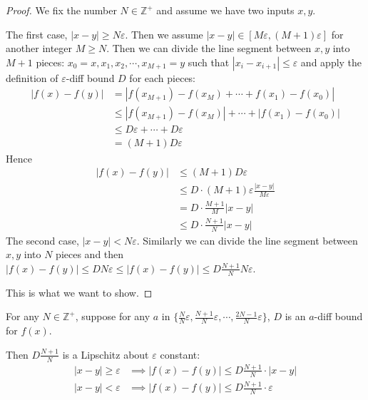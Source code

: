 \documentclass{llncs}
\begin{document}
\begin{proof} We fix the number $N\in\mathbb{Z}^+$ and assume we have two inputs $x, y$.
	
	The first case, $|x-y|\geq N\varepsilon$. Then we assume $|x-y| \in [M\varepsilon ,  (M+1)\varepsilon]$ for another integer $M\geq N$. Then we can divide the line segment between $x, y$ into $M+1$ pieces: $x_0 = x, x_1, x_2, \cdots, x_{M+1} = y$ such that $|x_i-x_{i+1}| \leq \varepsilon$ and apply the definition of $\varepsilon$-diff bound $D$ for each pieces:\begin{align*}
		|f(x)-f(y)| &= |f(x_{M+1})-f(x_M)+\cdots+f(x_1)-f(x_0)|\\
		&\leq |f(x_{M+1})-f(x_M)|+\cdots+|f(x_1)-f(x_0)|\\
		&\leq D\varepsilon + \cdots +D\varepsilon \\
		&= (M+1)D\varepsilon
	\end{align*}
	Hence\begin{align*}
		|f(x)-f(y)| &\leq (M+1)D\varepsilon \\
		&\leq D\cdot (M+1)\varepsilon \frac{|x-y|}{M\varepsilon}\\
		&= D\cdot\frac{M+1}{M} |x-y|\\
		&\leq   D\cdot\frac{N+1}{N} |x-y|
	\end{align*}
	The second case, $|x-y|< N\varepsilon$. Similarly we can divide the line segment between $x, y$ into $N$ pieces and then $|f(x)-f(y)|\leq D N\varepsilon\leq |f(x)-f(y)|\leq D \frac{N+1}{N} N\varepsilon$.
	
	This is what we want to show.
\end{proof}


\begin{proposition}
For any $N\in\mathbb{Z}^+$, suppose for any $a$ in $\{\frac{N}{N}\varepsilon,\frac{N+1}{N}\varepsilon,\cdots, \frac{2N-1}{N}\varepsilon\}$, $D$ is an $a$-diff bound for $f(x)$. 

Then $D\frac{N+1}{N}$ is a Lipschitz about $\varepsilon$ constant:\begin{align*}
	|x-y|\geq \varepsilon &\implies |f(x)-f(y)| \leq D\frac{N+1}{N} \cdot |x-y|\\
	|x-y|<\varepsilon &\implies |f(x)-f(y)| \leq D\frac{N+1}{N} \cdot \varepsilon\\
\end{align*}
\end{proposition}
\end{document}
